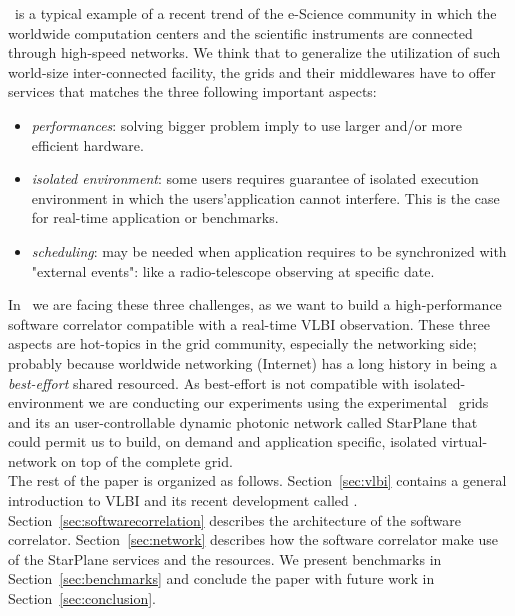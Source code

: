 \scarie\ is a typical example of a recent trend of the e-Science 
community in which the worldwide computation centers and the 
scientific instruments are connected through high-speed networks. We think that to 
generalize the utilization of such world-size inter-connected facility, 
the grids and their middlewares have to offer services that matches the three
following important aspects:
\begin{itemize}
\item \emph{performances}: solving bigger problem imply to use larger and/or
  more efficient hardware. 
\item \emph{isolated environment}: some users requires guarantee of isolated 
  execution environment in which the users'application cannot interfere. This is 
the case for real-time application or benchmarks.
\item \emph{scheduling}: may be needed when application requires to be synchronized
  with "external events": like a radio-telescope observing at specific date. 
\end{itemize}
In \scarie\ we are facing these three challenges, as we want to build a 
high-performance software correlator compatible with a real-time VLBI 
observation. These three aspects are hot-topics in the grid community,
especially the networking side; probably because worldwide networking (Internet) 
has a long history in being a \emph{best-effort} shared resourced. As best-effort 
is not compatible with isolated-environment we are conducting our 
experiments using the experimental \ grids and its an
user-controllable dynamic photonic network called StarPlane that could permit 
us to build, on demand and application specific, isolated virtual-network 
on top of the complete grid. \\


The rest of the paper is organized as follows. Section~\ref{sec:vlbi}
contains a general introduction to VLBI and its recent development 
called \evlbi. Section~\ref{sec:softwarecorrelation} describes the 
architecture of the software correlator. Section~\ref{sec:network} 
describes how the software correlator make use of the StarPlane services 
and the  resources. We present benchmarks in Section~\ref{sec:benchmarks} 
and conclude the paper with future work in Section~\ref{sec:conclusion}.




